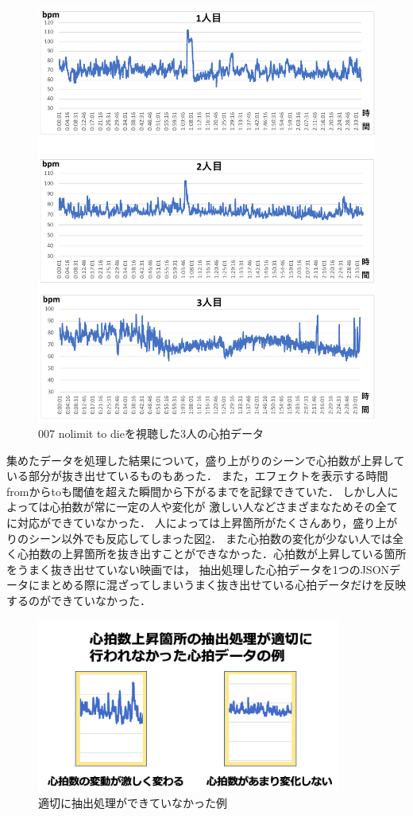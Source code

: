\begin{figure}[H]
    \centering
    \includegraphics[width=14cm]{images/chapter4/nolimitto.pdf}
    \caption{007 nolimit to dieを視聴した3人の心拍データ}
    \label{nolimit}
\end{figure}

集めたデータを処理した結果について，盛り上がりのシーンで心拍数が上昇している部分が抜き出せているものもあった．
また，エフェクトを表示する時間fromからtoも閾値を超えた瞬間から下がるまでを記録できていた．
しかし人によっては心拍数が常に一定の人や変化が 激しい人などさまざまなためその全てに対応ができていなかった．
人によっては上昇箇所がたくさんあり，盛り上がりのシーン以外でも反応してしまった図\ref{kekka}．
また心拍数の変化が少ない人では全く心拍数の上昇箇所を抜き出すことができなかった．心拍数が上昇している箇所をうまく抜き出せていない映画では，
抽出処理した心拍データを1つのJSONデータにまとめる際に混ざってしまいうまく抜き出せている心拍データだけを反映するのができていなかった．


\begin{figure}[H]
    \centering
    \includegraphics[width=10cm]{images/chapter4/miss.png}
    \caption{適切に抽出処理ができていなかった例}
    \label{kekka}
\end{figure}


